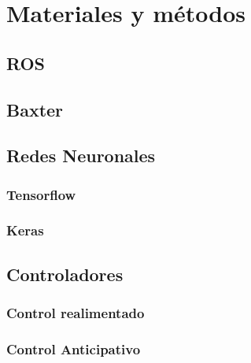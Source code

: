 \chapter{Materiales y métodos}
\section{ROS}
\section{Baxter}
\section{Redes Neuronales}
\subsection{Tensorflow}
\subsection{Keras}
\section{Controladores}
\subsection{Control realimentado}
\subsection{Control Anticipativo}